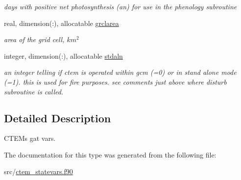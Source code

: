 \begin{DoxyCompactItemize}
\begin{DoxyCompactList}\small\item\em days with positive net photosynthesis (an) for use in the phenology subroutine \end{DoxyCompactList}\item 
\hypertarget{structctem__statevars_1_1veg__gat_a91f5c7f28b46c39b9caa9a4b07431aa7}{}real, dimension(\+:), allocatable \hyperlink{structctem__statevars_1_1veg__gat_a91f5c7f28b46c39b9caa9a4b07431aa7}{grclarea}\label{structctem__statevars_1_1veg__gat_a91f5c7f28b46c39b9caa9a4b07431aa7}

\begin{DoxyCompactList}\small\item\em area of the grid cell, $km^2$ \end{DoxyCompactList}\item 
\hypertarget{structctem__statevars_1_1veg__gat_a5d55217087f887d2739abe479418ed62}{}integer, dimension(\+:), allocatable \hyperlink{structctem__statevars_1_1veg__gat_a5d55217087f887d2739abe479418ed62}{stdaln}\label{structctem__statevars_1_1veg__gat_a5d55217087f887d2739abe479418ed62}

\begin{DoxyCompactList}\small\item\em an integer telling if ctem is operated within gcm (=0) or in stand alone mode (=1). this is used for fire purposes. see comments just above where disturb subroutine is called. \end{DoxyCompactList}\end{DoxyCompactItemize}


\subsection{Detailed Description}
C\+T\+E\+M\textquotesingle{}s \textquotesingle{}gat\textquotesingle{} vars. 

The documentation for this type was generated from the following file\+:\begin{DoxyCompactItemize}
\item 
src/\hyperlink{ctem__statevars_8f90}{ctem\+\_\+statevars.\+f90}\end{DoxyCompactItemize}
